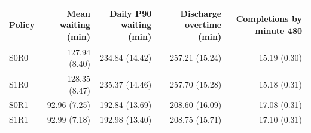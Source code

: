 \begin{tabular}{@{}lrrrr@{}}
\toprule
Policy & Mean waiting (min) & Daily P90 waiting (min) & Discharge overtime (min) & Completions by minute 480 \\
\midrule
S0R0 & 127.94 (8.40) & 234.84 (14.42) & 257.21 (15.24) & 15.19 (0.30) \\
S1R0 & 128.35 (8.47) & 235.37 (14.46) & 257.70 (15.28) & 15.18 (0.31) \\
S0R1 & 92.96 (7.25) & 192.84 (13.69) & 208.60 (16.09) & 17.08 (0.31) \\
S1R1 & 92.99 (7.18) & 192.98 (13.40) & 208.75 (15.71) & 17.10 (0.31) \\
\bottomrule
\end{tabular}
